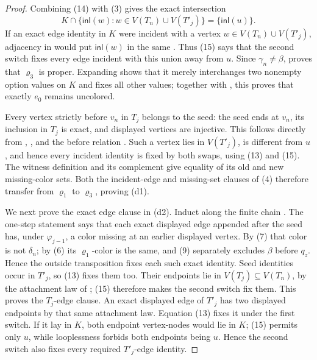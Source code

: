 \begin{proof}
Combining (14) with (3) gives the exact intersection
\[
 K\cap\{\mathsf{inl}(w):w\in V(T_n)\cup V(T'_j)\}
 =\{\mathsf{inl}(u)\}.                                       \tag{15}
\]
If an exact edge identity in \(K\) were incident with a vertex
\(w\in V(T_n)\cup V(T'_j)\), adjacency in
 would put \(\mathsf{inl}(w)\) in the
same .  Thus (15) says that the second switch
fixes every edge incident with this union away from \(u\).
Since \(\gamma_n\ne\beta\),  proves
that \(\varrho_3\) is proper.  Expanding
 shows that it merely interchanges two
nonempty option values on \(K\) and fixes all other values; together with
, this proves that exactly \(e_0\) remains
uncolored.

Every vertex strictly before \(v_n\) in \(T_j\) belongs to the seed:
the seed ends at \(v_n\), its inclusion in \(T_j\) is exact, and displayed
vertices are injective.  This follows directly from
,
, and the before relation
.  Such a vertex lies in \(V(T'_j)\), is
different from \(u\), and hence every incident identity is fixed by both
swaps, using (13) and (15).  The witness definition
 and its complement
 give equality of its old and new missing-color
sets.  Both the incident-edge and missing-set clauses of (4) therefore
transfer from \(\varrho_1\) to \(\varrho_3\), proving (d1).

We next prove the exact edge clause in (d2).  Induct along the finite
chain .  The one-step statement
 says that each exact displayed edge
appended after the seed has, under \(\varphi_{j-1}\), a color missing at
an earlier displayed vertex.  By (7) that color is not \(\delta_n\);
by (6) its \(\varrho_1\)-color is the same, and (9) separately excludes
\(\beta\) before \(q_z\).  Hence the outside transposition fixes each
such exact identity.  Seed identities occur in \(T'_j\), so (13) fixes
them too.  Their endpoints lie in \(V(T_j)\subseteq V(T_n)\), by the
attachment law of ; (15) therefore makes the second
switch fix them.  This proves the \(T_j\)-edge clause.  An exact displayed
edge of \(T'_j\) has two displayed endpoints by that same attachment law.
Equation (13) fixes it under the first switch.  If it lay in \(K\), both
endpoint vertex-nodes would lie in \(K\); (15) permits only \(u\), while
looplessness forbids both endpoints being \(u\).  Hence the second switch
also fixes every required \(T'_j\)-edge identity.


\end{proof}
